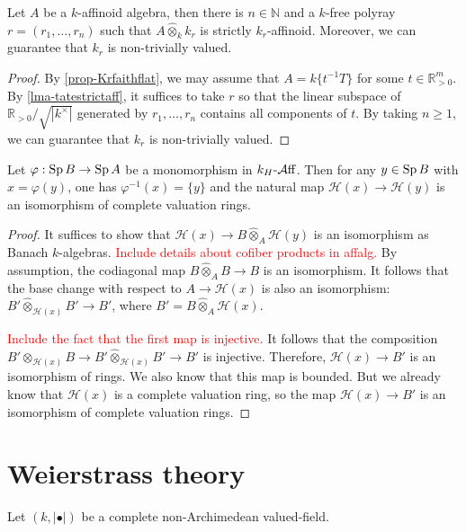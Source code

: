 \begin{proposition}\label{prop-redtostrictlykaff}
    Let $A$ be a $k$-affinoid algebra, then there is $n\in \mathbb{N}$ and a $k$-free polyray $r=(r_1,\ldots,r_n)$ such that $A\hat{\otimes}_k k_r$ is strictly $k_r$-affinoid. Moreover, we can guarantee that $k_r$ is non-trivially valued.
\end{proposition} 
\begin{proof}
    By \cref{prop-Krfaithflat}, we may assume that $A=k\{t^{-1}T\}$ for some $t\in \mathbb{R}^m_{>0}$. By \cref{lma-tatestrictaff}, it suffices to take $r$ so that the linear subspace of $\mathbb{R}_{>0}/\sqrt{|k^{\times}|}$ generated by $r_1,\ldots,r_n$ contains all components of $t$. By taking $n\geq 1$, we can guarantee that $k_r$ is non-trivially valued.
\end{proof}

\begin{proposition}
    Let $\varphi:\operatorname{Sp} B\rightarrow \operatorname{Sp} A$ be a monomorphism in $k_H\text{-}\mathcal{A}\mathrm{ff}$. Then for any $y\in \operatorname{Sp} B$ with $x=\varphi(y)$, one has $\varphi^{-1}(x)=\{y\}$ and the natural map $\mathscr{H}(x)\rightarrow \mathscr{H}(y)$ is an isomorphism of complete valuation rings.
\end{proposition}
\begin{proof}
    It suffices to show that $\mathscr{H}(x)\rightarrow B\hat{\otimes}_A \mathscr{H}(y)$ is an isomorphism as Banach $k$-algebras. \textcolor{red}{Include details about cofiber products in affalg.} By assumption, the codiagonal map $B\hat{\otimes}_A B\rightarrow B$ is an isomorphism. It follows that the base change with respect to $A\rightarrow \mathscr{H}(x)$ is also an isomorphism: $B'\hat{\otimes}_{\mathscr{H}(x)}B'\rightarrow B'$, where $B'=B\hat{\otimes}_A \mathscr{H}(x)$.

    \textcolor{red}{Include the fact that the first map is injective.}
    It follows that the composition $B'\otimes_{\mathscr{H}(x)}B\rightarrow B'\hat{\otimes}_{\mathscr{H}(x)}B'\rightarrow B'$ is injective.
    Therefore, $\mathscr{H}(x)\rightarrow B'$ is an isomorphism of rings.  We also know that this map is bounded.
    But we already know that $\mathscr{H}(x)$ is a complete valuation ring, so the map $\mathscr{H}(x)\rightarrow B'$ is an isomorphism of complete valuation rings.
\end{proof}

\section{Weierstrass theory}
Let $(k,|\bullet|)$ be a complete non-Archimedean valued-field.


